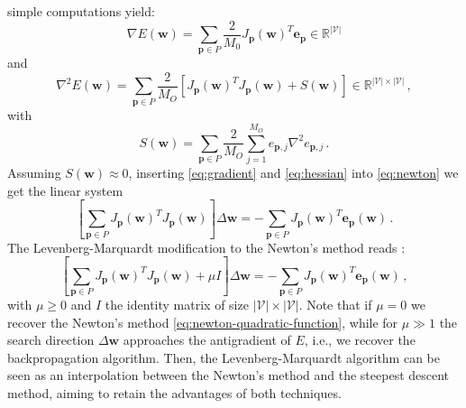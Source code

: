 \documentclass[12pt, a4paper, twoside, openright]{report}
\numberwithin{equation}{chapter}
\theoremstyle{theorem}
\theoremstyle{definition}
\theoremstyle{remark}
\theoremstyle{proposition}
\numberwithin{figure}{chapter}
\begin{document}
		simple computations yield:
		\begin{equation}
			\label{eq:gradient}
			\nabla E(\boldsymbol{w}) = \sum_{\boldsymbol{p} \in P} \dfrac{2}{M_0} J_{\boldsymbol{p}}(\boldsymbol{w})^T \boldsymbol{e}_{\boldsymbol{p}} \in \mathbb{R}^{|\mathcal{V}|}
		\end{equation}
		and
		\begin{equation}
			\label{eq:hessian}
			\nabla^2 E(\boldsymbol{w}) = \sum_{\boldsymbol{p} \in P} \dfrac{2}{M_O} \left[ J_{\boldsymbol{p}}(\boldsymbol{w})^T J_{\boldsymbol{p}}(\boldsymbol{w}) + S(\boldsymbol{w}) \right] \in \mathbb{R}^{|\mathcal{V}| \times |\mathcal{V}|} \, ,
		\end{equation}
		with
		\begin{equation*}
			S(\boldsymbol{w}) = \sum_{\boldsymbol{p} \in P} \dfrac{2}{M_O} \sum_{j = 1}^{M_O} e_{\boldsymbol{p},j} \nabla^2 e_{\boldsymbol{p},j} \, .
		\end{equation*}
		Assuming $S(\boldsymbol{w}) \approx 0$, inserting \eqref{eq:gradient} and \eqref{eq:hessian} into \eqref{eq:newton} we get the linear system
		\begin{equation}
			\label{eq:newton-quadratic-function}
			\left[ \sum_{\boldsymbol{p} \in P} J_{\boldsymbol{p}}(\boldsymbol{w})^T J_{\boldsymbol{p}}(\boldsymbol{w}) \right] \Delta \boldsymbol{w} = - \sum_{\boldsymbol{p} \in P} J_{\boldsymbol{p}}(\boldsymbol{w})^T \boldsymbol{e}_{\boldsymbol{p}}(\boldsymbol{w}) \, .
		\end{equation} 
		The Levenberg-Marquardt modification to the Newton's method reads \cite{Hag94, Mar63}:
		\begin{equation}
			\label{eq:levenberg-marquardt}
			\left[ \sum_{\boldsymbol{p} \in P} J_{\boldsymbol{p}}(\boldsymbol{w})^T J_{\boldsymbol{p}}(\boldsymbol{w}) + \mu I \right] \Delta \boldsymbol{w} = - \sum_{\boldsymbol{p} \in P} J_{\boldsymbol{p}}(\boldsymbol{w})^T \boldsymbol{e}_{\boldsymbol{p}}(\boldsymbol{w}) \, ,
		\end{equation}
		with $\mu \geq 0$ and $I$ the identity matrix of size $|\mathcal{V}| \times |\mathcal{V}|$. Note that if $\mu = 0$ we recover the Newton's method \eqref{eq:newton-quadratic-function}, while for $\mu \gg 1$ the search direction $\Delta \boldsymbol{w}$ approaches the antigradient of $E$, i.e., we recover the backpropagation algorithm. Then, the Levenberg-Marquardt algorithm can be seen as an interpolation between the Newton's method and the steepest descent method, aiming to retain the advantages of both techniques.
		
\end{document}
